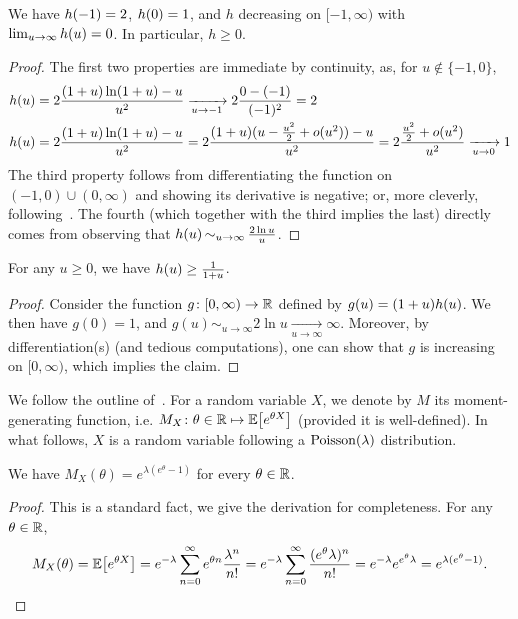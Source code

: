 \documentclass[10pt]{article}
\newcommand{\bennettfunc}{h}
\newcommand{\bennett}[1]{\bennettfunc\mleft(#1\mright)}
\begin{document}
\begin{fact}\label{fact:bennett:function}
  We have $\bennett{-1}=2$, $\bennett{0}=1$, and $\bennettfunc$ decreasing on $[-1,\infty)$ with $\lim_{u\to\infty} \bennett{u}=0$. In particular, $\bennettfunc\geq 0$.
\end{fact}
\begin{proof}
  The first two properties are immediate by continuity, as, for $u\notin\{-1,0\}$,
  \begin{align*}
      \bennett{u} &= 2\frac{(1+u)\ln(1+u)-u}{u^2} \xrightarrow[u\to-1]{} 2\frac{0-(-1)}{(-1)^2} = 2 \\
      \bennett{u} &= 2\frac{(1+u)\ln(1+u)-u}{u^2} = 2\frac{(1+u)(u-\frac{u^2}{2}+o(u^2))-u}{u^2}
                 = 2\frac{\frac{u^2}{2}+o(u^2)}{u^2} \xrightarrow[u\to0]{} 1
  \end{align*}
  The third property follows from differentiating the function on $(-1,0)\cup(0,\infty)$ and showing its derivative is negative; or, more cleverly, following~\cite[Exercise 14, (ii)]{Pollard:15}. The fourth (which together with the third implies the last) directly comes from observing that $\bennett{u} \operatorname*{\sim}_{u\to\infty} \frac{2\ln u}{u}$.
\end{proof}

\begin{fact}\label{fact:bennett:function:ii}
  For any $u\geq 0$, we have $\bennett{u} \geq \frac{1}{1+u}$.
\end{fact}
\begin{proof}
  Consider the function $g\colon [0,\infty) \to \mathbb{R}$ defined by $g(u) = (1+u)\bennett{u}$. We then have $g(0)=1$, and $g(u) \operatorname*{\sim}_{u\to\infty} 2\ln u \xrightarrow[u\to\infty]{} \infty$. Moreover, by differentiation(s) (and tedious computations), one can show that $g$ is increasing on $[0,\infty)$, which implies the claim.
\end{proof}

We follow the outline of~\cite[Exercise 15]{Pollard:15}. For a random variable $X$, we denote by $M$ its moment-generating function, i.e. $M_X\colon \theta\in\mathbb{R} \mapsto \mathbb{E}\!\left[e^{\theta X}\right]$ (provided it is well-defined). In what follows, $X$ is a random variable following a $\operatorname{Poisson}\!\left( \lambda \right) $ distribution.

\begin{fact}\label{fact:mgf:poisson}
  We have $M_X(\theta) = e^{\lambda(e^\theta-1)}$ for every $\theta \in \mathbb{R}$.
\end{fact}
\begin{proof}
This is a standard fact, we give the derivation for completeness. For any $\theta\in\mathbb{R}$,
\[
    M_X(\theta) = \mathbb{E}\!\left[e^{\theta X}\right] = e^{-\lambda}\sum_{n=0}^\infty e^{\theta n}\frac{\lambda^n}{n!} = e^{-\lambda}\sum_{n=0}^\infty \frac{(e^\theta \lambda)^n}{n!} = e^{-\lambda} e^{e^\theta \lambda}
    = e^{\lambda(e^\theta-1)}.
\]
\end{proof}
\end{document}
